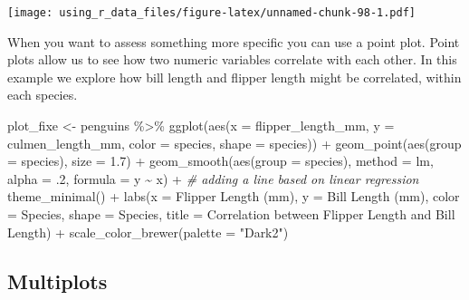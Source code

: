 \documentclass[
]{book}
\newenvironment{Shaded}{\begin{snugshade}}{\end{snugshade}}
\newcommand{\AttributeTok}[1]{\textcolor[rgb]{0.77,0.63,0.00}{#1}}
\newcommand{\CommentTok}[1]{\textcolor[rgb]{0.56,0.35,0.01}{\textit{#1}}}
\newcommand{\DecValTok}[1]{\textcolor[rgb]{0.00,0.00,0.81}{#1}}
\newcommand{\FloatTok}[1]{\textcolor[rgb]{0.00,0.00,0.81}{#1}}
\newcommand{\FunctionTok}[1]{\textcolor[rgb]{0.00,0.00,0.00}{#1}}
\newcommand{\NormalTok}[1]{#1}
\newcommand{\OtherTok}[1]{\textcolor[rgb]{0.56,0.35,0.01}{#1}}
\newcommand{\SpecialCharTok}[1]{\textcolor[rgb]{0.00,0.00,0.00}{#1}}
\newcommand{\StringTok}[1]{\textcolor[rgb]{0.31,0.60,0.02}{#1}}
\begin{document}
\texttt{[image: using\_r\_data\_files/figure-latex/unnamed-chunk-98-1.pdf]}

When you want to assess something more specific you can use a point plot.
Point plots allow us to see how two numeric variables correlate with each other.
In this example we explore how bill length and flipper length might be correlated, within each species.

\begin{Shaded}
\begin{Highlighting}[]
\NormalTok{plot\_fixe }\OtherTok{\textless{}{-}}\NormalTok{ penguins }\SpecialCharTok{\%\textgreater{}\%} 
  \FunctionTok{ggplot}\NormalTok{(}\FunctionTok{aes}\NormalTok{(}\AttributeTok{x =}\NormalTok{ flipper\_length\_mm, }\AttributeTok{y =}\NormalTok{ culmen\_length\_mm, }\AttributeTok{color =}\NormalTok{ species, }\AttributeTok{shape =}\NormalTok{ species)) }\SpecialCharTok{+} 
  \FunctionTok{geom\_point}\NormalTok{(}\FunctionTok{aes}\NormalTok{(}\AttributeTok{group =}\NormalTok{ species), }\AttributeTok{size =} \FloatTok{1.7}\NormalTok{) }\SpecialCharTok{+}
  \FunctionTok{geom\_smooth}\NormalTok{(}\FunctionTok{aes}\NormalTok{(}\AttributeTok{group =}\NormalTok{ species), }\AttributeTok{method =} \StringTok{\textquotesingle{}lm\textquotesingle{}}\NormalTok{, }\AttributeTok{alpha =}\NormalTok{ .}\DecValTok{2}\NormalTok{, }\AttributeTok{formula =} \StringTok{\textquotesingle{}y \textasciitilde{} x\textquotesingle{}}\NormalTok{) }\SpecialCharTok{+} \CommentTok{\# adding a line based on linear regression}
  \FunctionTok{theme\_minimal}\NormalTok{() }\SpecialCharTok{+}
  \FunctionTok{labs}\NormalTok{(}\AttributeTok{x =} \StringTok{\textquotesingle{}Flipper Length (mm)\textquotesingle{}}\NormalTok{, }\AttributeTok{y =} \StringTok{\textquotesingle{}Bill Length (mm)\textquotesingle{}}\NormalTok{,}
       \AttributeTok{color =} \StringTok{\textquotesingle{}Species\textquotesingle{}}\NormalTok{, }\AttributeTok{shape =} \StringTok{\textquotesingle{}Species\textquotesingle{}}\NormalTok{,}
       \AttributeTok{title =} \StringTok{\textquotesingle{}Correlation between Flipper Length and Bill Length\textquotesingle{}}\NormalTok{) }\SpecialCharTok{+}
  \FunctionTok{scale\_color\_brewer}\NormalTok{(}\AttributeTok{palette =} \StringTok{"Dark2"}\NormalTok{)}
\end{Highlighting}
\end{Shaded}

\hypertarget{multiplots}{%
\subsection{Multiplots}\label{multiplots}}
\end{document}
